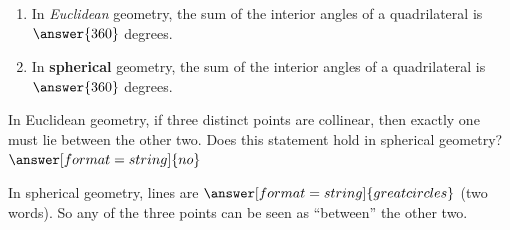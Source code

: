 \documentclass{ximera}
\begin{document}
\begin{problem}
\begin{enumerate}
\item In \emph{Euclidean} geometry, the sum of the interior angles of a quadrilateral is 
$\answer{360}$ degrees.
\item In \textbf{spherical} geometry, the sum of the interior angles of a quadrilateral is 
$\answer{360}$ degrees.
\end{enumerate}
\end{problem}

\begin{problem} %
In Euclidean geometry, if three distinct points are collinear, then exactly one must lie between the other two.  Does this statement hold in spherical geometry? 
$\answer[format=string]{no}$

\begin{problem}

In spherical geometry, lines are $\answer[format=string]{great circles}$ (two words).  So any of the three points can be seen as ``between'' the other two.  
\end{problem}
\end{problem}



%
\end{document}

